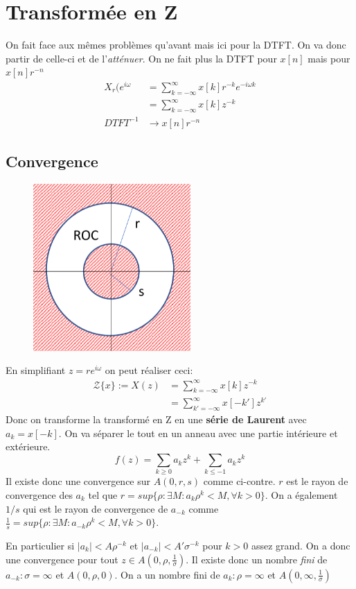 \documentclass{report}
\begin{document}
\section{Transformée en Z}
On fait face aux mêmes problèmes qu'avant mais ici pour la DTFT. On va donc partir de celle-ci et de l'\textit{atténuer}. On ne fait plus la DTFT pour $x[n]$ mais pour $x[n]r^{-n}$
\begin{align*}
X_r(e^{i \omega} &= \sum_{k = - \infty}^{\infty} x[k] r^{-k} e^{-i \omega k}\\
& = \sum_{k = - \infty}^{\infty} x[k] z^{-k}\\
DTFT^{-1} & \rightarrow x[n] r^{-n}
\end{align*}

\subsection{Convergence}
\begin{figure}
\centering
\includegraphics[width=6cm]{img/ROCLaurent.png}
\end{figure}
En simplifiant $z = r e^{i \omega}$ on peut réaliser ceci:
\begin{align*}
\mathcal{Z}\{x\} := X(z) &= \sum_{k = - \infty}^{\infty} x[k] z^{-k} \\
& = \sum_{k' = - \infty}^{\infty} x[-k'] z^{k'}
\end{align*}
Donc on transforme la transformé en Z en une \textbf{série de Laurent} avec $a_k = x[-k]$. On va séparer le tout en un anneau avec une partie intérieure et extérieure.
\begin{equation}
f(z) = \sum_{k \geqslant 0} a_k z^k + \sum_{k \leqslant -1} a_k z^k
\end{equation}
Il existe donc une convergence sur $A(0,r,s)$ comme ci-contre. $r$ est le rayon de convergence des $a_k$ tel que $r = sup\{\rho : \exists M: a_k \rho^k < M, \forall k > 0 \}$. On a également $1/s$ qui est le rayon de convergence de $a_{-k}$ comme $\frac{1}{s} = sup\{\rho : \exists M : a_{-k} \rho^k < M, \forall k > 0 \}$.\par
En particulier si $|a_k| < A \rho^{-k}$ et $|a_{-k}| < A' \sigma^{-k}$ pour $k > 0$ assez grand. On a donc une convergence pour tout $z \in A \left( 0, \rho, \frac{1}{\sigma} \right)$. Il existe donc un nombre \textit{fini} de $a_{-k} : \sigma = \infty$ et $A(0, \rho, 0)$. On a un nombre fini de $a_k : \rho = \infty$ et $A\left( 0, \infty , \frac{1}{\sigma} \right)$\\
\end{document}
